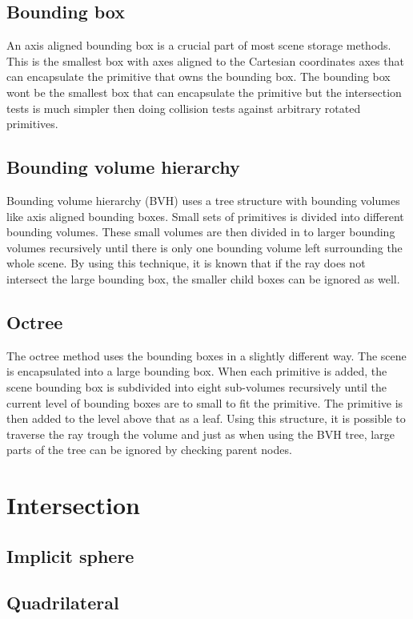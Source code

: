 \documentclass[]{report}   %
\begin{document}
\subsection{Bounding box}
An axis aligned bounding box is a crucial part of most scene storage methods.
This is the smallest box with axes aligned to the Cartesian coordinates axes that can encapsulate the primitive that owns the bounding box.
The bounding box wont be the smallest box that can encapsulate the primitive but the intersection tests is much simpler then doing collision tests against arbitrary rotated primitives.

\subsection{Bounding volume hierarchy}
Bounding volume hierarchy (BVH) uses a tree structure with bounding volumes like axis aligned bounding boxes. 
Small sets of primitives is divided into different bounding volumes.
These small volumes are then divided in to larger bounding volumes recursively until there is only one bounding volume left surrounding the whole scene.
By using this technique, it is known that if the ray does not intersect the large bounding box, the smaller child boxes can be ignored as well.

\subsection{Octree}
The octree method uses the bounding boxes in a slightly different way.
The scene is encapsulated into a large bounding box.
When each primitive is added, the scene bounding box is subdivided into eight sub-volumes recursively until the current level of bounding boxes are to small to fit the primitive.
The primitive is then added to the level above that as a leaf.
Using this structure, it is possible to traverse the ray trough the volume and just as when using the BVH tree, large parts of the tree can be ignored by checking parent nodes.

\section{Intersection}
\subsection{Implicit sphere}
\subsection{Quadrilateral}
\end{document}
